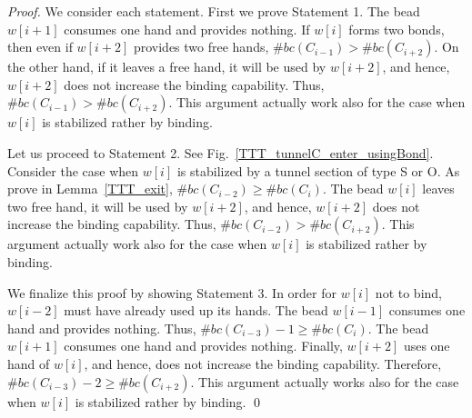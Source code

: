 \begin{proof}

	We consider each statement. First we prove Statement 1.
	The bead $w[i+1]$ consumes one hand and provides nothing.
	If $w[i]$ forms two bonds, then even if $w[i+2]$ provides two free hands, $\#bc(C_{i-1}) > \#bc(C_{i+2})$.
	On the other hand, if it leaves a free hand, it will be used by $w[i+2]$, and hence, $w[i+2]$ does not increase the binding capability.
	Thus, $\#bc(C_{i-1}) > \#bc(C_{i+2})$.
	This argument actually work also for the case when $w[i]$ is stabilized rather by binding.
	
	Let us proceed to Statement 2.
	See Fig.~\ref{TTT_tunnelC_enter_usingBond}.
	Consider the case when $w[i]$ is stabilized by a tunnel section of type S or O.
	As prove in Lemma~\ref{TTT_exit}, $\#bc(C_{i-2}) \geq \#bc(C_{i})$.	The bead $w[i]$ leaves two free hand, it will be used by $w[i+2]$, and hence, $w[i+2]$ does not increase the binding capability.
	Thus, $\#bc(C_{i-2}) > \#bc(C_{i+2})$.
	This argument actually work also for the case when $w[i]$ is stabilized rather by binding.
	
	We finalize this proof by showing Statement 3.
	In order for $w[i]$ not to bind, $w[i-2]$ must have already used up its hands.
	The bead $w[i-1]$ consumes one hand and provides nothing.
	Thus,  $\#bc(C_{i-3}) - 1 \geq \#bc(C_{i})$.
	The bead $w[i+1]$ consumes one hand and provides nothing.
	Finally, $w[i+2]$ uses one hand of $w[i]$, and hence, does not increase the binding capability.
	Therefore, $\#bc(C_{i-3}) -2 \geq \#bc(C_{i+2})$.
	This argument actually works also for the case when $w[i]$ is stabilized rather by binding. \qed
\end{proof}

